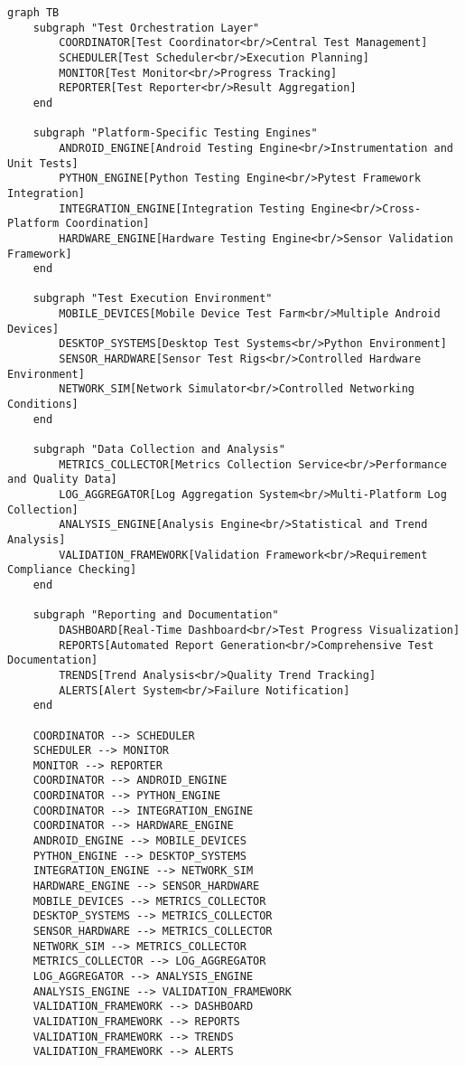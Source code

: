 \documentclass[11pt,a4paper]{report}
\begin{document}
\begin{verbatim}
graph TB
    subgraph "Test Orchestration Layer"
        COORDINATOR[Test Coordinator<br/>Central Test Management]
        SCHEDULER[Test Scheduler<br/>Execution Planning]
        MONITOR[Test Monitor<br/>Progress Tracking]
        REPORTER[Test Reporter<br/>Result Aggregation]
    end

    subgraph "Platform-Specific Testing Engines"
        ANDROID_ENGINE[Android Testing Engine<br/>Instrumentation and Unit Tests]
        PYTHON_ENGINE[Python Testing Engine<br/>Pytest Framework Integration]
        INTEGRATION_ENGINE[Integration Testing Engine<br/>Cross-Platform Coordination]
        HARDWARE_ENGINE[Hardware Testing Engine<br/>Sensor Validation Framework]
    end

    subgraph "Test Execution Environment"
        MOBILE_DEVICES[Mobile Device Test Farm<br/>Multiple Android Devices]
        DESKTOP_SYSTEMS[Desktop Test Systems<br/>Python Environment]
        SENSOR_HARDWARE[Sensor Test Rigs<br/>Controlled Hardware Environment]
        NETWORK_SIM[Network Simulator<br/>Controlled Networking Conditions]
    end

    subgraph "Data Collection and Analysis"
        METRICS_COLLECTOR[Metrics Collection Service<br/>Performance and Quality Data]
        LOG_AGGREGATOR[Log Aggregation System<br/>Multi-Platform Log Collection]
        ANALYSIS_ENGINE[Analysis Engine<br/>Statistical and Trend Analysis]
        VALIDATION_FRAMEWORK[Validation Framework<br/>Requirement Compliance Checking]
    end

    subgraph "Reporting and Documentation"
        DASHBOARD[Real-Time Dashboard<br/>Test Progress Visualization]
        REPORTS[Automated Report Generation<br/>Comprehensive Test Documentation]
        TRENDS[Trend Analysis<br/>Quality Trend Tracking]
        ALERTS[Alert System<br/>Failure Notification]
    end

    COORDINATOR --> SCHEDULER
    SCHEDULER --> MONITOR
    MONITOR --> REPORTER
    COORDINATOR --> ANDROID_ENGINE
    COORDINATOR --> PYTHON_ENGINE
    COORDINATOR --> INTEGRATION_ENGINE
    COORDINATOR --> HARDWARE_ENGINE
    ANDROID_ENGINE --> MOBILE_DEVICES
    PYTHON_ENGINE --> DESKTOP_SYSTEMS
    INTEGRATION_ENGINE --> NETWORK_SIM
    HARDWARE_ENGINE --> SENSOR_HARDWARE
    MOBILE_DEVICES --> METRICS_COLLECTOR
    DESKTOP_SYSTEMS --> METRICS_COLLECTOR
    SENSOR_HARDWARE --> METRICS_COLLECTOR
    NETWORK_SIM --> METRICS_COLLECTOR
    METRICS_COLLECTOR --> LOG_AGGREGATOR
    LOG_AGGREGATOR --> ANALYSIS_ENGINE
    ANALYSIS_ENGINE --> VALIDATION_FRAMEWORK
    VALIDATION_FRAMEWORK --> DASHBOARD
    VALIDATION_FRAMEWORK --> REPORTS
    VALIDATION_FRAMEWORK --> TRENDS
    VALIDATION_FRAMEWORK --> ALERTS
\end{verbatim}
\end{document}
